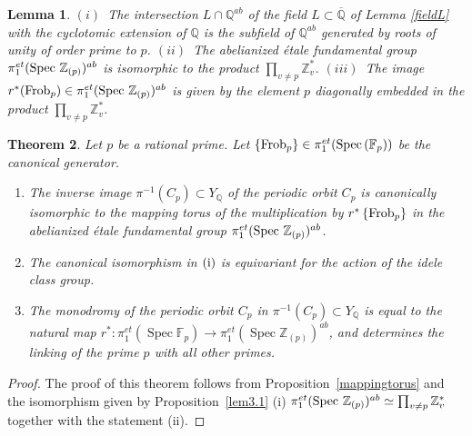 \documentclass[letterpaper,11pt]{article}
\def\Spec{{\rm Spec\,}}
\def\Fr{{\rm Frob}}
\def\F{{\mathbb F}}
\def\Q{{\mathbb Q}}
\def\Z{\mathbb{Z}}
\theoremstyle{plain}
\newtheorem{thm}{Theorem}[section]
\newtheorem{lem}[thm]{Lemma}
\begin{document}
\begin{lem} $(i)$~The intersection $L\cap \Q^{ab}$ of the field $L\subset \overline\Q$ of Lemma \ref{fieldL} with the cyclotomic extension of $\Q$ is the subfield of $\Q^{ab}$ generated by roots of unity of order prime to $p$.\newline
$(ii)$~The abelianized \'etale fundamental group $\pi_1^{et}(\Spec\,\Z_{(p)})^{ab}$ is isomorphic to the product $\prod_{v\neq p}\Z_v^*$.\newline
$(iii)$~The image $r^*(\Fr_p)\in \pi_1^{et}(\Spec\,\Z_{(p)})^{ab}$ is given by the element $p$ diagonally embedded in the product $\prod_{v\neq p}\Z_v^*$.
\end{lem}
\fi



\begin{thm}\label{main2}
	 Let  $p$ be a rational prime. Let $\left\{{\rm F r o b}_{p}\right\}\in \pi_1^{e t}(\Spec(\F_p))$ be the canonical generator. 
     \begin{enumerate}
         \item[(i)] The inverse image $\pi^{-1}(C_p)\subset Y_\Q$ of the periodic orbit $C_p$  is canonically isomorphic to the mapping torus of the multiplication by $r^*\left\{{\rm F r o b}_{p}\right\}$  in the abelianized \'etale fundamental group $\pi_1^{e t}(\Spec \, \Z_{(p)})^{ab}$.
          \item[(ii)] The canonical isomorphism in $(\rm i)$ is equivariant for the action of the idele class group.
         \item[(iii)] The monodromy of the periodic orbit $C_p$ in $\pi^{-1}(C_p)\subset Y_\Q$ is equal to the natural map $r^*:\pi_1^{e t}\left(\operatorname{Spec} \mathbb{F}_p\right) \rightarrow \pi_1^{e t}(\operatorname{Spec} \mathbb{Z}_{(p)})^{a b}$, and determines the linking of the prime $p$ with all other primes.
         \end{enumerate}
     \end{thm}
     \begin{proof} The proof of this theorem follows from Proposition~\ref{mappingtorus} and the isomorphism given by Proposition~\ref{lem3.1} (i)  $\pi_1^{et}(\Spec\,\Z_{(p)})^{ab}\simeq \prod_{v\neq p}\Z_v^*$ together with the statement (ii).
     \end{proof}
\end{document}
